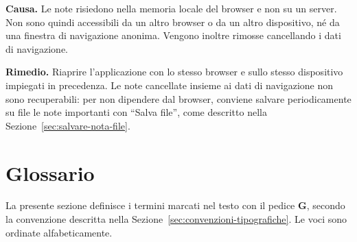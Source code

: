 \documentclass[a4paper, 10pt]{article}
\begin{document}
\textbf{Causa.} Le note risiedono nella memoria locale del browser e non su un server. Non sono quindi accessibili da un altro browser o da un altro dispositivo, né da una finestra di navigazione anonima. Vengono inoltre rimosse cancellando i dati di navigazione.

\textbf{Rimedio.} Riaprire l'applicazione con lo stesso browser e sullo stesso dispositivo impiegati in precedenza. Le note cancellate insieme ai dati di navigazione non sono recuperabili: per non dipendere dal browser, conviene salvare periodicamente su file le note importanti con ``Salva file'', come descritto nella Sezione~\ref{sec:salvare-nota-file}.

\section{Glossario}
\label{sec:glossario}
La presente sezione definisce i termini marcati nel testo con il pedice \textbf{G}, secondo la convenzione descritta nella Sezione~\ref{sec:convenzioni-tipografiche}. Le voci sono ordinate alfabeticamente.
\end{document}
